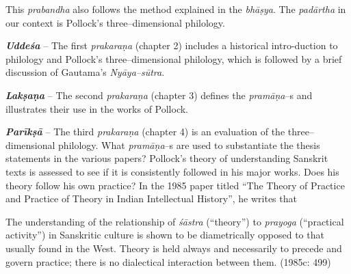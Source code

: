 This \textit{prabandha} also follows the method explained in the \textit{bhāṣya}. The \textit{padārtha} in our context is Pollock’s three–dimensional philology.

\textit{\textbf{Uddeśa}} – The first \textit{prakaraṇa} (chapter 2) includes a historical intro-\break duction to philology and Pollock’s three–dimensional philology, which is followed by a brief discussion of Gautama’s \textit{Nyāya–sūtra}.


\textit{\textbf{Lakṣaṇa }} – The second \textit{prakaraṇa} (chapter 3) defines the \textit{pramāṇa}–s and illustrates their use in the works of Pollock.

\textit{\textbf{Parīkṣā }} – The third \textit{prakaraṇa} (chapter 4) is an evaluation of the three–dimensional philology. What \textit{pramāṇa}–s are used to substantiate the thesis statements in the various papers? Pollock’s theory of understanding Sanskrit texts is assessed to see if it is consistently followed in his major works. Does his theory follow his own practice? In the 1985 paper titled “The Theory of Practice and Practice of Theory in Indian Intellectual History”, he writes that

\begin{myquote}
The understanding of the relationship of \textit{śāstra} (“theory”) to \textit{prayoga} (“practical activity”) in Sanskritic culture is shown to be diametrically opposed to that usually found in the West. Theory is held always and necessarily to precede and govern practice; there is no dialectical interaction between them. (1985c: 499)
\end{myquote}

